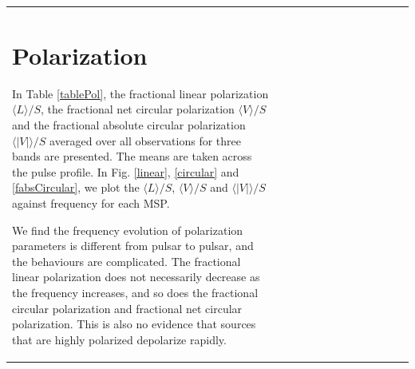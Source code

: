 \documentclass[useAMS,usenatbib]{mn2e}
\begin{document}
\begin{table}
\begin{center}
\begin{tabular}{lcccccccccccc}
\section{Polarization}

In Table \ref{tablePol}, the fractional linear polarization $\langle L \rangle/S$, 
the fractional net circular polarization $\langle V \rangle/S$ and the fractional absolute 
circular polarization $\langle|V|\rangle/S$ averaged over all observations for 
three bands are presented. 
%
The means are taken across the pulse profile.
%
In Fig. \ref{linear}, \ref{circular} and \ref{fabsCircular}, we plot the $\langle L \rangle/S$, 
$\langle V \rangle/S$ and $\langle|V|\rangle/S$ against frequency for each MSP.
%

We find the frequency evolution of polarization parameters is different from pulsar 
to pulsar, and the behaviours are complicated. 
%
The fractional linear polarization does not necessarily decrease as the frequency 
increases, and so does the fractional circular polarization and fractional net circular 
polarization. 
%
This is also no evidence that sources that are highly polarized depolarize rapidly.
%


\end{tabular}
\end{center}
\end{table}
\end{document}
